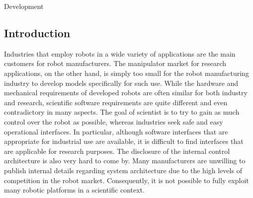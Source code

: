 \documentclass[a4paper]{book}
\begin{document}
\begin{chapter}{Development}
\subsection{Introduction}
Industries that employ robots in a wide variety of applications are the main customers for robot manufacturers. The manipulator market for research applications, on the other hand, is simply too small for the robot manufacturing industry to develop models specifically for such use. 
While the hardware and mechanical requirements of developed robots are often similar for both industry and research, scientific software requirements are quite different and even contradictory in many aspects. The goal of scientist is to try to gain as much control over the robot as possible, whereas industries seek safe and easy operational interfaces.
In particular, although software interfaces that are appropriate for industrial use are available, it is difficult to find interfaces that are applicable for research purposes. The disclosure of the internal control architecture is also very hard to come by. Many manufacturers are unwilling to publish internal details regarding system architecture due to the high levels of competition in the robot market. Consequently, it is not possible to fully exploit many robotic platforms in a scientific context.


\end{chapter}
\end{document}

